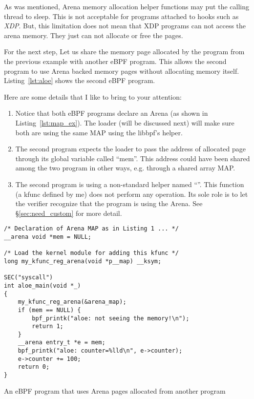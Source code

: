 \documentclass{article} \usepackage{graphicx}
\begin{document}
As was mentioned, Arena memory allocation helper functions may put the calling
thread to sleep. This is not acceptable for programs attached to hooks such as
\emph{XDP}. But, this limitation does not mean that XDP programs can not access
the arena memory. They just can not allocate or free the pages.

For the next step, Let us share the memory page allocated by the program
from the previous example with another eBPF program. This allows the second
program to use Arena backed memory pages without allocating memory itself.
Listing~\ref{lst:aloe} shows the second eBPF program.

Here are some details that I like to bring to your attention:
\begin{enumerate}
    \item Notice that both eBPF programs declare an Arena (as shown in
        Listing~\ref{lst:map_ex}). The loader (will be discussed next) will
        make sure both are using the same MAP using the libbpf's
         helper.
    \item The second program expects the loader to pass the address of
        allocated page through its global variable called ``mem''. This address
        could have been shared among the two program in other ways, e.g.
        through a shared array MAP\@.
    \item The second program is using a non-standard helper named
        ``''. This function (a kfunc defined by me)
        does not perform any operation. Its sole role is to let the verifier
        recognize that the program is using the Arena. See
        \S\ref{sec:need_custom} for more detail.
\end{enumerate}

\begin{listing}
\begin{verbatim}
/* Declaration of Arena MAP as in Listing 1 ... */
__arena void *mem = NULL;

/* Load the kernel module for adding this kfunc */
long my_kfunc_reg_arena(void *p__map) __ksym;

SEC("syscall")
int aloe_main(void *_)
{
    my_kfunc_reg_arena(&arena_map);
    if (mem == NULL) {
        bpf_printk("aloe: not seeing the memory!\n");
        return 1;
    }
    __arena entry_t *e = mem;
    bpf_printk("aloe: counter=%lld\n", e->counter);
    e->counter += 100;
    return 0;
}
\end{verbatim}
\caption{An eBPF program that uses Arena pages allocated from another program}
\label{lst:aloe}
\end{listing}
\end{document}
